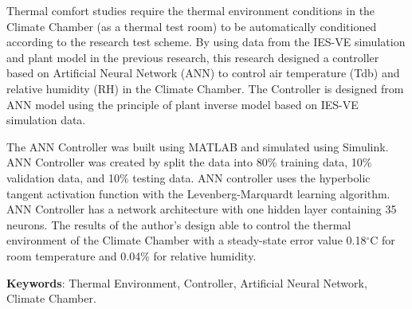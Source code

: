 Thermal comfort studies require the thermal environment conditions in the Climate Chamber (as a thermal test room) to be automatically conditioned according to the research test scheme. By using data from the IES-VE simulation\cite{skripsiIchfan} and plant model\cite{skripsiTanto} in the previous research, this research designed a controller based on Artificial Neural Network (ANN) to control air temperature (Tdb) and relative humidity (RH) in the Climate Chamber. The Controller is designed from ANN model using the principle of plant inverse model based on IES-VE simulation data.

The ANN Controller was built using MATLAB and simulated using Simulink. ANN Controller was created by split the data into 80\% training data, 10\% validation data, and 10\% testing data. ANN controller uses the hyperbolic tangent activation function with the Levenberg-Marquardt learning algorithm. ANN Controller has a network architecture with one hidden layer containing 35 neurons. The results of the author's design able to control the thermal environment of the Climate Chamber with a steady-state error value 0.18$^\circ$C for room temperature and 0.04\% for relative humidity.

\vspace{0.5cm}
\hspace{-1.2cm}
\textbf{Keywords}: Thermal Environment, Controller, Artificial Neural Network, Climate Chamber.

